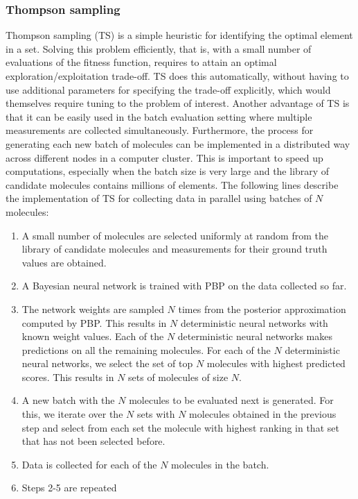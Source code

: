 \subsubsection{Thompson sampling}

Thompson sampling (TS) \cite{Thompson_1933} is a simple heuristic for identifying the optimal element in a set. Solving this problem efficiently, that is, with a small number of evaluations of the fitness function, requires to attain an optimal exploration/exploitation trade-off. TS does this automatically, without having to use additional parameters for specifying the trade-off explicitly, which would themselves require tuning to the problem of interest. Another advantage of TS is that it can be easily used
in the batch evaluation setting where multiple measurements are collected simultaneously. Furthermore, the process for generating each new batch of molecules can be implemented in a distributed way across different nodes in a computer cluster. This is important to speed up computations, especially when the batch size is very large and the library of candidate molecules contains millions of elements. The following lines describe the implementation of TS for collecting data in parallel using batches of $N$ molecules:
\begin{enumerate}
\item A small number of molecules are selected uniformly at random from the library of candidate molecules and measurements for their ground truth values are obtained.
\item A Bayesian neural network is trained with PBP on the data collected so far.
\item The network weights are sampled $N$ times from the posterior approximation computed by PBP. This results in $N$ deterministic neural networks with known weight values. Each of the $N$ deterministic neural networks makes predictions on all the remaining molecules. For each of the $N$ deterministic neural networks, we select the set of top $N$ molecules with highest predicted scores. This results in $N$ sets of molecules of size $N$.
\item A new batch with the $N$ molecules to be evaluated next is generated. For this, we iterate over the $N$ sets with $N$ molecules obtained in the previous step and select from each set the molecule with highest ranking in that set that has not been selected before.
\item Data is collected for each of the $N$ molecules in the batch.
\item Steps 2-5 are repeated
\end{enumerate}

